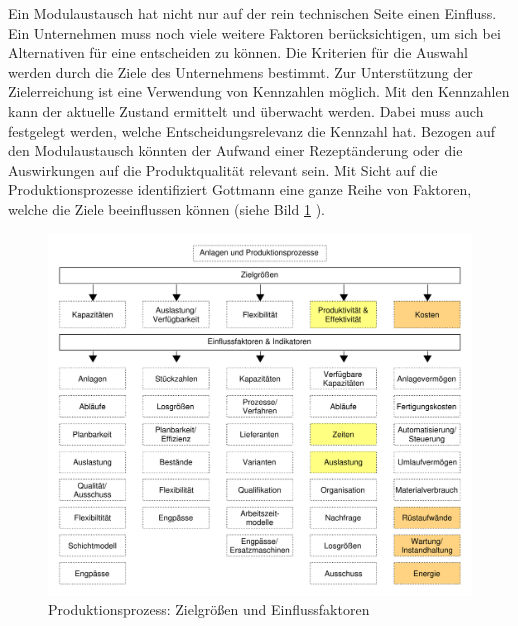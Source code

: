 Ein Modulaustausch hat nicht nur auf der rein technischen Seite einen Einfluss. Ein Unternehmen muss noch viele weitere Faktoren berücksichtigen, um sich bei Alternativen für eine entscheiden zu können. Die Kriterien für die Auswahl werden durch die Ziele des Unternehmens bestimmt. Zur Unterstützung der Zielerreichung ist eine Verwendung von Kennzahlen möglich. Mit den Kennzahlen kann der aktuelle Zustand ermittelt und überwacht werden. Dabei muss auch festgelegt werden, welche Entscheidungsrelevanz die Kennzahl hat.  Bezogen auf den Modulaustausch könnten der Aufwand einer Rezeptänderung oder die Auswirkungen auf die Produktqualität relevant sein. Mit Sicht auf die Produktionsprozesse identifiziert Gottmann \cite{Gottmann2016} eine ganze Reihe von Faktoren, welche die Ziele beeinflussen können (siehe Bild \ref{pic:Produktionsprozesse-Zielgroessen} \citep[50]{Gottmann2016}).
\begin{figure}[htb]
\centering
\includegraphics[scale=0.5]{DA_files/Bilder/Analyse/Produktionsprozesse-Zielgroessen.pdf}
\caption{Produktionsprozess: Zielgrößen und Einflussfaktoren}
\label{pic:Produktionsprozesse-Zielgroessen}
\end{figure}

